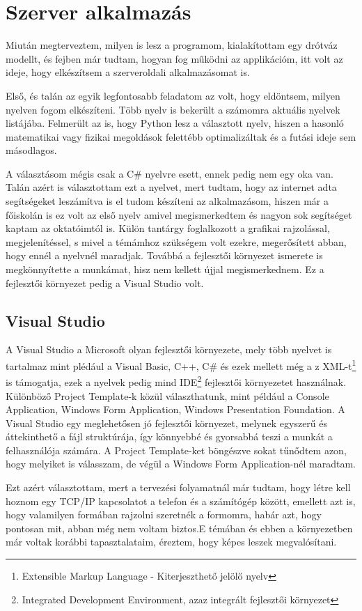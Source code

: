 \documentclass{thesis-ekf}
\theoremstyle{definition}
\theoremstyle{remark}
\begin{document}
\chapter{Szerver alkalmazás}
Miután megterveztem, milyen is lesz a programom, kialakítottam egy drótváz modellt, és fejben már tudtam, hogyan fog működni az applikációm, itt volt az ideje, hogy elkészítsem a szerveroldali alkalmazásomat is.
\par Első, és talán az egyik legfontosabb feladatom az volt, hogy eldöntsem, milyen nyelven fogom elkészíteni. Több nyelv is bekerült a számomra aktuális nyelvek listájába. Felmerült az is, hogy Python lesz a választott nyelv, hiszen a hasonló matematikai vagy fizikai megoldások felettébb optimalizáltak és a futási ideje sem másodlagos.
\par A választásom mégis csak a C\# nyelvre esett, ennek pedig nem egy oka van. Talán azért is választottam ezt a nyelvet, mert tudtam, hogy az internet adta segítségeket leszámítva is el tudom készíteni az alkalmazásom, hiszen már a főiskolán is ez volt az első nyelv amivel megismerkedtem és nagyon sok segítséget kaptam az oktatóimtól is. Külön tantárgy foglalkozott a grafikai rajzolással, megjelenítéssel, s mivel a témámhoz szükségem volt ezekre, megerősített abban, hogy ennél a nyelvnél maradjak. Továbbá a fejlesztői környezet ismerete is megkönnyítette a munkámat, hisz nem kellett újjal megismerkednem. Ez a fejlesztői környezet pedig a Visual Studio volt.
\section{Visual Studio}
A Visual Studio a Microsoft olyan fejlesztői környezete, mely több nyelvet is tartalmaz mint plédául a Visual Basic, C++, C\# és ezek mellett még a z XML-t\footnote{Extensible Markup Language - Kiterjeszthető jelölő nyelv} is támogatja, ezek a nyelvek pedig mind IDE\footnote{Integrated Development Environment, azaz integrált fejlesztői környezet} fejlesztői környezetet használnak. Különböző Project Template-k közül választhatunk, mint például a Console Application, Windows Form Application, Windows Presentation Foundation. A Visual Studio egy meglehetősen jó fejlesztői környezet, melynek egyszerű és áttekinthető a fájl struktúrája, így könnyebbé és gyorsabbá teszi a munkát a felhasználója számára. A Project Template-ket böngészve sokat tűnődtem azon, hogy melyiket is válasszam, de végül a Windows Form Application-nél maradtam. 
\par Ezt azért választottam, mert a tervezési folyamatnál már tudtam, hogy létre kell hoznom egy TCP/IP kapcsolatot a telefon és a számítógép között, emellett azt is, hogy valamilyen formában rajzolni szeretnék a formomra, habár azt, hogy pontosan mit, abban még nem voltam biztos.E témában és ebben a környezetben már voltak korábbi tapasztalataim, éreztem, hogy képes leszek megvalósítani.
\end{document}
